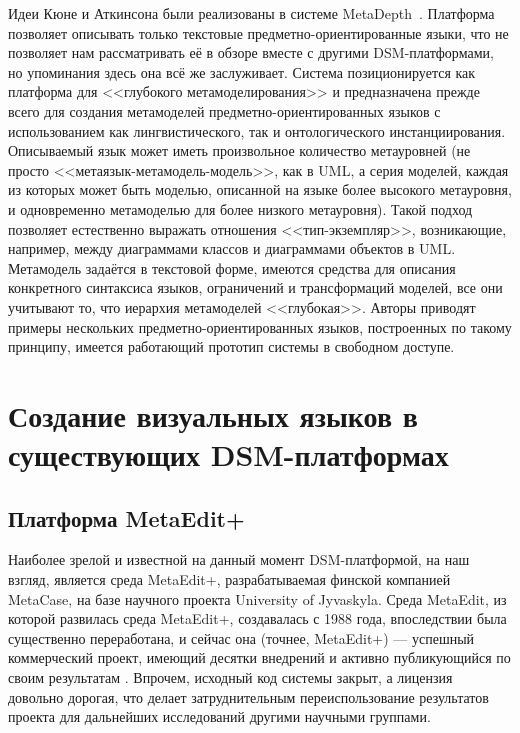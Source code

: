 Идеи Кюне и Аткинсона были реализованы в системе MetaDepth~\cite{de2010deep, de2012domain}. Платформа позволяет описывать
только текстовые предметно-ориентированные языки, что не позволяет нам рассматривать её в обзоре вместе с другими \ac{DSM}-платформами,
но упоминания здесь она всё же заслуживает. Система позиционируется как платформа для <<глубокого метамоделирования>>
и предназначена прежде всего для создания метамоделей предметно-ориентированных языков с использованием как лингвистического,
так и онтологического инстанциирования. Описываемый язык может иметь произвольное количество метауровней 
(не просто <<метаязык-метамодель-модель>>, как в UML, а серия моделей, каждая из которых может быть
моделью, описанной на языке более высокого метауровня, и одновременно метамоделью для более низкого метауровня). Такой
подход позволяет естественно выражать отношения <<тип-экземпляр>>, возникающие, например, между диаграммами 
классов и диаграммами объектов в UML. Метамодель задаётся в текстовой форме, имеются средства для описания
конкретного синтаксиса языков, ограничений и трансформаций моделей, все они учитывают то, что иерархия метамоделей <<глубокая>>. 
Авторы приводят примеры нескольких предметно-ориентированных языков, построенных по такому принципу, имеется 
работающий прототип системы в свободном доступе.

\section{Создание визуальных языков в существующих DSM-платформах}
\subsection{Платформа MetaEdit+}
Наиболее зрелой и известной на данный момент \ac{DSM}-платформой, на наш взгляд, является среда MetaEdit+, 
разрабатываемая финской компанией MetaCase, на базе научного проекта University of Jyvaskyla. 
Среда MetaEdit, из которой развилась среда MetaEdit+, создавалась с 1988 года, впоследствии 
была существенно переработана, и сейчас она (точнее, MetaEdit+) --- успешный коммерческий проект, 
имеющий десятки внедрений и активно публикующийся по своим результатам \cite{kelly2008domain, luoma2004defining, tolvanen2007advanced, tolvanen2009metaedit}. 
Впрочем, исходный код системы закрыт, а лицензия довольно дорогая, что делает затруднительным 
переиспользование результатов проекта для дальнейших исследований другими научными группами.

